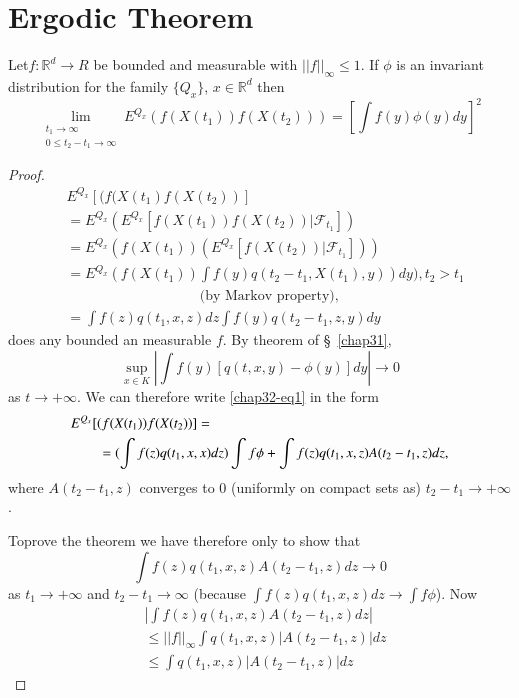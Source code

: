 \chapter{Ergodic Theorem}\label{chap32}

\begin{theorem*}
Let\pageoriginale $f:\mathbb{R}^{d}\to R$ be bounded and measurable
with $||f||_{\infty}\leq 1$. If $\phi$ is an invariant distribution
for the family $\{Q_{x}\}$, $x\in \mathbb{R}^{d}$ then 
$$
\lim\limits_{\substack{t_{1}\to \infty\\ 0\leq t_{2}-t_{1}\to
    \infty}}E^{Q_{x}}(f(X(t_{1}))f(X(t_{2})))=[\int f(y)\phi(y)dy]^{2}
$$
\end{theorem*}

\begin{proof}
\begin{align*}
& E^{Q_{x}}[(f(X(t_{1})f(X(t_{2}))]\\
& =E^{Q_{x}}(E^{Q_{x}}[f(X(t_{1}))f(X(t_{2}))|\mathscr{F}_{t_{1}}])\\
&
  =E^{Q_{x}}(f(X(t_{1}))(E^{Q_{x}}[f(X(t_{2}))|\mathscr{F}_{t_{1}}]))\\
& =E^{Q_{x}}(f(X(t_{1}))\int
  f(y)q(t_{2}-t_{1},X(t_{1}),y))dy),t_{2}>t_{1}\\
&\hspace{4cm} \text{(by Markov property),}\\
&= \int f(z)q(t_{1},x,z)dz\int
  f(y)q(t_{2}-t_{1},z,y)dy\tag{1}\label{chap32-eq1} 
\end{align*}
does any bounded an measurable $f$. By theorem of \S\ \ref{chap31},
$$
\sup\limits_{x\in K}|\int f(y)[q(t,x,y)-\phi(y)]dy|\to 0
$$
as $t\to +\infty$. We can therefore write \eqref{chap32-eq1} in the
form
\begin{align*}
& E^{Q_{x}}[(f(X(t_{1}))f(X(t_{2}))]=\\
&\qquad =(\int f(z)q(t_{1},x,x)dz)\int f\phi+\int
  f(z)q(t_{1},x,z)A(t_{2}-t_{1},z)dz, 
\end{align*}
where $A(t_{2}-t_{1},z)$ converges to $0$ (uniformly on compact sets
as) $t_{2}-t_{1}\to +\infty$.

To\pageoriginale prove the theorem we have therefore only to show that
$$
\int f(z)q(t_{1},x,z)A(t_{2}-t_{1},z)dz\to 0
$$
as $t_{1}\to +\infty$ and $t_{2}-t_{1}\to \infty$ (because $\int
f(z)q(t_{1},x,z)dz\to \int f\phi$). Now
\begin{align*}
& |\int f(z)q(t_{1},x,z)A(t_{2}-t_{1},z)dz|\\
& \leq ||f||_{\infty}\int q(t_{1},x,z)|A(t_{2}-t_{1},z)|dz\\
& \leq \int q(t_{1},x,z)|A(t_{2}-t_{1},z)|dz\tag{2}\label{chap32-eq2}
\end{align*}


\end{proof}
